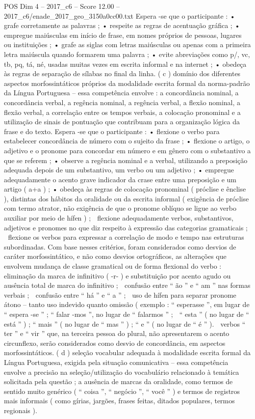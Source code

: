 \begin{textsample}{POS Dim 4 – 2017\_c6 – Score 12.00 – 2017\_c6/enade\_2017\_geo\_3150a0cc00.txt}
Espera -se que o participante : • grafe corretamente as palavras ; • respeite as regras de acentuação gráfica ; • empregue maiúsculas em início de frase, em nomes próprios de pessoas, lugares ou instituições ; • grafe as siglas com letras maiúsculas ou apenas com a primeira letra maiúscula quando formarem uma palavra ; • evite abreviações como p/, vc, tb, pq, tá, né, usadas muitas vezes em escrita informal e na internet ; • obedeça às regras de separação de sílabas no final da linha. ( c ) domínio dos diferentes aspectos morfossintáticos próprios da modalidade escrita formal da norma-padrão da Língua Portuguesa – essa competência envolve : a concordância nominal, a concordância verbal, a regência nominal, a regência verbal, a flexão nominal, a flexão verbal, a correlação entre os tempos verbais, a colocação pronominal e a utilização de sinais de pontuação que contribuam para a organização lógica da frase e do texto.
Espera -se que o participante : • flexione o verbo para estabelecer concordância de número com o sujeito da frase ; • flexione o artigo, o adjetivo e o pronome para concordar em número e em gênero com o substantivo a que se referem ; • observe a regência nominal e a verbal, utilizando a preposição adequada depois de um substantivo, um verbo ou um adjetivo ; • empregue adequadamente o acento grave indicador da crase entre uma preposição e um artigo ( a+a ) ; • obedeça às regras de colocação pronominal ( próclise e ênclise ), distintas dos hábitos da oralidade ou da escrita informal ( exigência de próclise com termo atrator, não exigência de que o pronome oblíquo se ligue ao verbo auxiliar por meio de hífen ) ;  flexione adequadamente verbos, substantivos, adjetivos e pronomes no que diz respeito à expressão das categorias gramaticais ;  flexione os verbos para expressar a correlação de modo e tempo nas estruturas subordinadas.
Com base nesses critérios, foram considerados como desvios de caráter morfossintático, e não como desvios ortográficos, as alterações que envolvem mudança de classe gramatical ou de forma flexional do verbo :  eliminação da marca de infinitivo ( -r- ) e substituição por acento agudo ou ausência total de marca do infinitivo ;  confusão entre “ ão ” e “ am ” nas formas verbais ;  confusão entre “ há ” e “ a ” ;  uso de hífen para separar pronome átono – tanto uso indevido quanto omissão ( exemplo : “ esperasse ”, em lugar de “ espera -se ” ; “ falar -mos ”, no lugar de “ falarmos ” ;  “ esta ” ( no lugar de “ está ” ) ; “ mais ” ( no lugar de “ mas ” ) ; “ e ” ( no lugar de “ é ” ).  verbos “ ter ” e “ vir ” que, na terceira pessoa do plural, não apresentarem o acento circunflexo, serão considerados como desvio de concordância, em aspectos morfossintáticos. ( d ) seleção vocabular adequada à modalidade escrita formal da Língua Portuguesa, exigida pela situação comunicativa – essa competência envolve a precisão na seleção/utilização do vocabulário relacionado à temática solicitada pela questão ; a ausência de marcas da oralidade, como termos de sentido muito genérico ( “ coisa ”, “ negócio ”, “ você ” ) e termos de registros mais informais ( como gírias, jargões, frases feitas, ditados populares, termos regionais ).

\end{textsample}
